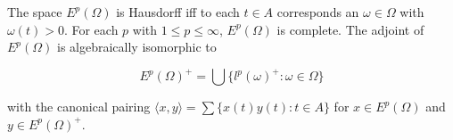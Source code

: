 The space $E^p(\Omega)$ is Hausdorff iff to each $t \in A$ corresponds an $\omega \in \Omega$ with $\omega(t) > 0$. For each $p$ with $1 \leq p \leq \infty$, $E^p(\Omega)$ is complete. The adjoint of $E^p(\Omega)$ is algebraically isomorphic to

$$E^p(\Omega)^+ = \bigcup \{l^p(\omega)^+ : \omega \in \Omega\}$$

with the canonical pairing $\langle x,y \rangle = \sum \{x(t)y(t): t \in A\}$ for $x \in E^p(\Omega)$ and $y \in E^p(\Omega)^+$.
